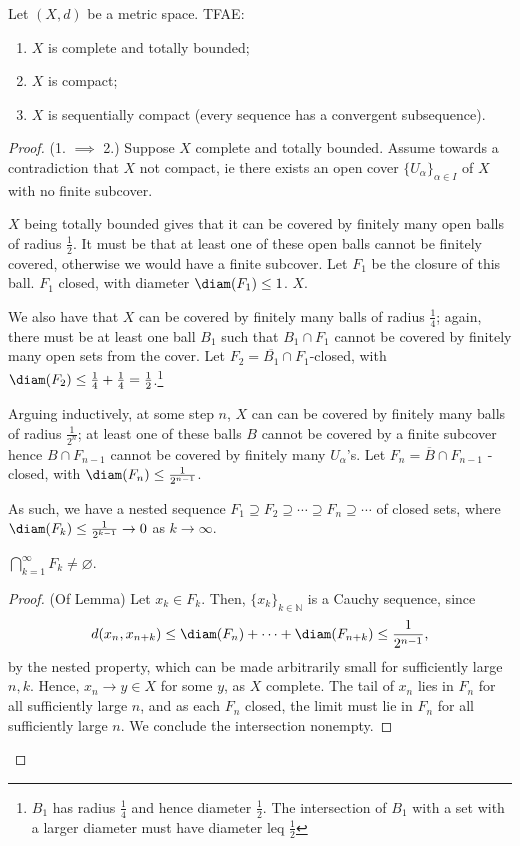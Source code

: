 \begin{theorem}
    Let $(X,d)$ be a metric space. TFAE:
        \begin{enumerate}
            \item $X$ is complete and totally bounded;
            \item $X$ is compact;
            \item $X$ is sequentially compact (every sequence has a convergent subsequence).
        \end{enumerate}
\end{theorem}

\begin{proof}
    (1. $\implies$ 2.) Suppose $X$ complete and totally bounded. Assume towards a contradiction that $X$ not compact, ie there exists an open cover $\{U_\alpha\}_{\alpha \in I}$ of $X$ with no finite subcover. 
    
    $X$ being totally bounded gives that it can be covered by finitely many open balls of radius $\frac{1}{2}$. It must be that at least one of these open balls cannot be finitely covered, otherwise we would have a finite subcover. Let $F_1$ be the closure of this ball. $F_1$ closed, with diameter $\diam(F_1)\leq 1$. $X$.

    We also have that $X$ can be covered by finitely many balls of radius $\frac{1}{4}$; again, there must be at least one ball $B_1$ such that $B_1 \cap F_1$ cannot be covered by finitely many open sets from the cover. Let $F_2 = \overline{B_1} \cap F_1$-closed, with $\diam (F_2) \leq \frac{1}{4} + \frac{1}{4} = \frac{1}{2}$.\footnote{$B_1$ has radius $\frac{1}{4}$ and hence diameter $\frac{1}{2}$. The intersection of $B_1$ with a set with a larger diameter must have diameter leq $\frac{1}{2}$}

    Arguing inductively, at some step $n$, $X$ can can be covered by finitely many balls of radius $\frac{1}{2^n}$; at least one of these balls $B$ cannot be covered by a finite subcover hence $B \cap  F_{n-1}$ cannot be covered by finitely many $U_\alpha$'s. Let $F_n = \overline{B} \cap F_{n-1}$ -closed, with $\diam (F_n) \leq \frac{1}{2^{n-1}}$.
    
    As such, we have a nested sequence $F_1 \supseteq F_2 \supseteq \cdots \supseteq F_n \supseteq \cdots $ of closed sets, where $\diam (F_{k}) \leq \frac{1}{2^{k-1}} \to 0$ as $k \to \infty$.

    \begin{lemma-inline}
        $\bigcap_{k=1}^\infty F_k\neq \varnothing$.
    \end{lemma-inline}
    \begin{proof}(Of Lemma)
        Let $x_k \in F_k$. Then, $\{x_k\}_{k \in \mathbb{N}}$ is a Cauchy sequence, since $$
        d(x_n, x_{n+k}) \leq \diam(F_{n}) + \cdots + \diam(F_{n+k}) \leq \frac{1}{2^{n-1}},
        $$
        by the nested property, which can be made arbitrarily small for sufficiently large $n, k$. Hence, $x_n \to y \in X$ for some $y$, as $X$ complete. The tail of $x_n$ lies in $F_n$ for all sufficiently large $n$, and as each $F_n$ closed, the limit must lie in $F_n$ for all sufficiently large $n$. We conclude the intersection nonempty.
    \end{proof}


\end{proof}
